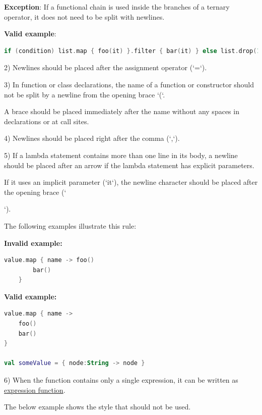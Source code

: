 {\textbf{Exception}: If a functional chain is used inside the branches of a ternary operator, it does not need to be split with newlines.



\textbf{Valid example}:  

\begin{lstlisting}[language=Kotlin]
if (condition) list.map { foo(it) }.filter { bar(it) } else list.drop(1)
\end{lstlisting}
  

2)	Newlines should be placed after the assignment operator (`=`).

3)	In function or class declarations, the name of a function or constructor should not be split by a newline from the opening brace `(`.

    A brace should be placed immediately after the name without any spaces in declarations or at call sites.

4)	Newlines should be placed right after the comma (`,`).

5)	If a lambda statement contains more than one line in its body, a newline should be placed after an arrow if the lambda statement has explicit parameters.

    If it uses an implicit parameter (`it`), the newline character should be placed after the opening brace (`{`). 

    The following examples illustrate this rule:





\textbf{Invalid example:}

\begin{lstlisting}[language=Kotlin]
    value.map { name -> foo()
        bar()
    }
\end{lstlisting}


\textbf{Valid example:} 

\begin{lstlisting}[language=Kotlin]
value.map { name ->
    foo()
    bar()
}

val someValue = { node:String -> node }
\end{lstlisting}


6) When the function contains only a single expression, it can be written as \href{https://kotlinlang.org/docs/reference/functions.html#single-expression-functions}{expression function}. 

   The below example shows the style that should not be used.

   

}}
